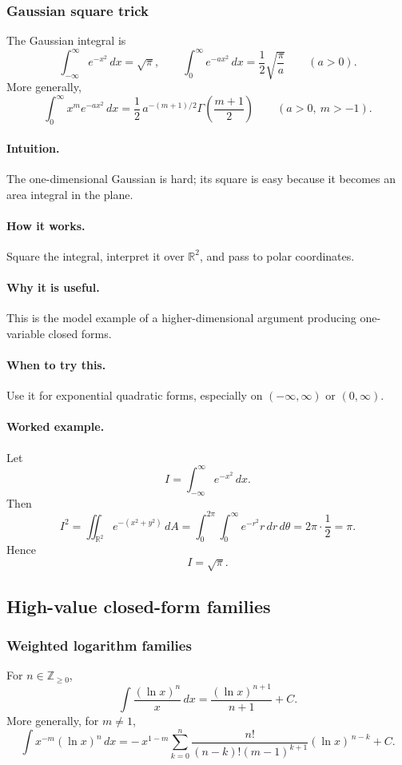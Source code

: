 \documentclass[12pt]{article}
\begin{document}
\newpage
\subsubsection{Gaussian square trick}
The Gaussian integral is
\[
\int_{-\infty}^{\infty} e^{-x^2}\,dx=\sqrt{\pi},
\qquad
\int_0^\infty e^{-ax^2}\,dx=\frac12\sqrt{\frac{\pi}{a}}
\qquad (a>0).
\]
More generally,
\[
\int_0^\infty x^m e^{-ax^2}\,dx
=\frac12\,a^{-(m+1)/2}\Gamma\!\left(\frac{m+1}{2}\right)
\qquad (a>0,\ m>-1).
\]

\paragraph{Intuition.}
The one-dimensional Gaussian is hard; its square is easy because it becomes an area integral in the plane.

\paragraph{How it works.}
Square the integral, interpret it over \(\mathbb{R}^2\), and pass to polar coordinates.

\paragraph{Why it is useful.}
This is the model example of a higher-dimensional argument producing one-variable closed forms.

\paragraph{When to try this.}
Use it for exponential quadratic forms, especially on \((-\infty,\infty)\) or \((0,\infty)\).

\paragraph{Worked example.}
Let
\[
I=\int_{-\infty}^{\infty} e^{-x^2}\,dx.
\]
Then
\[
I^2=\iint_{\mathbb{R}^2} e^{-(x^2+y^2)}\,dA
=\int_0^{2\pi}\!\!\int_0^\infty e^{-r^2}r\,dr\,d\theta
=2\pi\cdot \frac12=\pi.
\]
Hence
\[
I=\sqrt{\pi}.
\]


\newpage
\subsection{High-value closed-form families}

\subsubsection{Weighted logarithm families}
For \(n\in\mathbb Z_{\ge 0}\),
\[
\int \frac{(\ln x)^n}{x}\,dx
=\frac{(\ln x)^{n+1}}{n+1}+C.
\]
More generally, for \(m\neq 1\),
\[
\int x^{-m}(\ln x)^n\,dx
=
-\,x^{1-m}\sum_{k=0}^{n}
\frac{n!}{(n-k)!(m-1)^{k+1}}(\ln x)^{\,n-k}+C.
\]
\end{document}
